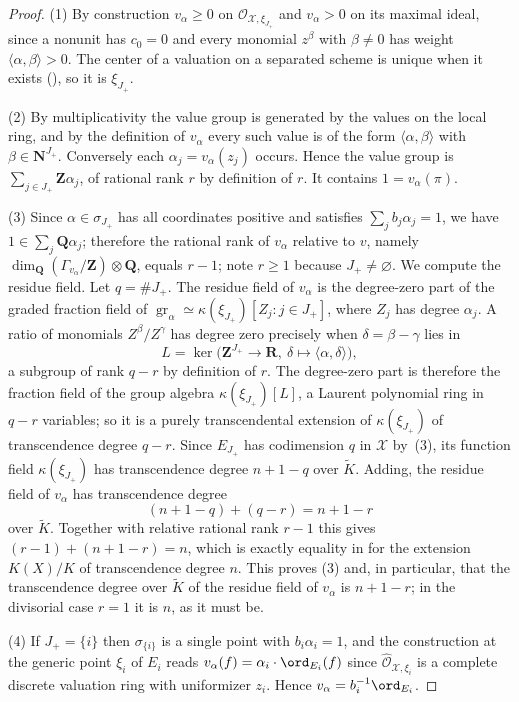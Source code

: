 \begin{proof}
(1) By construction $v_\alpha\ge0$ on
$\mathcal O_{\mathcal X,\xi_{J_+}}$ and $v_\alpha>0$ on its maximal
ideal, since a nonunit has $c_0=0$ and every monomial $z^\beta$ with
$\beta\neq0$ has weight $\langle\alpha,\beta\rangle>0$. The center of a
valuation on a separated scheme is unique when it exists
(), so it is $\xi_{J_+}$.

(2) By multiplicativity the value group is generated by the values on the
local ring, and by the definition of $v_\alpha$ every such value is of the
form $\langle\alpha,\beta\rangle$ with $\beta\in\mathbf N^{J_+}$.
Conversely each $\alpha_j=v_\alpha(z_j)$ occurs. Hence the value group is
$\sum_{j\in J_+}\mathbf Z\alpha_j$, of rational rank $r$ by definition
of $r$. It contains $1=v_\alpha(\pi)$.

(3) Since $\alpha\in\sigma_{J_+}$ has all coordinates positive and
satisfies $\sum_{j}b_j\alpha_j=1$, we have $1\in\sum_j\mathbf Q\alpha_j$;
therefore the rational rank of $v_\alpha$ relative to $v$, namely
$\dim_{\mathbf Q}(\Gamma_{v_\alpha}/\mathbf Z)\otimes\mathbf Q$, equals
$r-1$; note $r\ge1$ because $J_+\neq\varnothing$. We compute the
residue field. Let $q=\#J_+$. The residue field of $v_\alpha$ is the
degree-zero part of the graded fraction field of
$\operatorname{gr}_\alpha\simeq\kappa(\xi_{J_+})[Z_j:j\in J_+]$, where
$Z_j$ has degree $\alpha_j$. A ratio of monomials $Z^\beta/Z^\gamma$
has degree zero precisely when $\delta=\beta-\gamma$ lies in
\[
 L=\ker\bigl(\mathbf Z^{J_+}\to\mathbf R,\
   \delta\mapsto\langle\alpha,\delta\rangle\bigr),
\]
a subgroup of rank $q-r$ by definition of $r$. The degree-zero part is
therefore the fraction field of the group algebra
$\kappa(\xi_{J_+})[L]$, a Laurent polynomial ring in $q-r$ variables; so
it is a purely transcendental extension of $\kappa(\xi_{J_+})$ of
transcendence degree $q-r$. Since $E_{J_+}$ has codimension $q$ in
$\mathcal X$ by
\,(3), its function field
$\kappa(\xi_{J_+})$ has transcendence degree $n+1-q$ over
$\widetilde K$. Adding, the residue field of $v_\alpha$ has
transcendence degree
\[
 (n+1-q)+(q-r)=n+1-r
\]
over $\widetilde K$. Together with relative rational rank $r-1$ this
gives $(r-1)+(n+1-r)=n$, which is exactly equality in
 for the extension $K(X)/K$ of
transcendence degree $n$. This proves (3) and, in particular, that the
transcendence degree over $\widetilde K$ of the residue field of
$v_\alpha$ is $n+1-r$; in the divisorial case $r=1$ it is $n$, as it
must be.

(4) If $J_+=\{i\}$ then $\sigma_{\{i\}}$ is a single point with
$b_i\alpha_i=1$, and the construction at the generic point $\xi_i$ of
$E_i$ reads $v_\alpha(f)=\alpha_i\cdot\ord_{E_i}(f)$ since
$\widehat{\mathcal O}_{\mathcal X,\xi_i}$ is a complete discrete valuation
ring with uniformizer $z_i$. Hence $v_\alpha=b_i^{-1}\ord_{E_i}$.
\end{proof}

